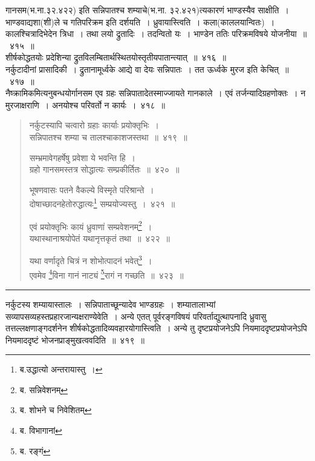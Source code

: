 \documentclass[11pt, openany]{book}
\begin{document}
गानसम(भ.ना.३२.४२२) इति सन्निपातश्च शम्याचे(भ.ना. ३२.४२१)त्यकारणं भाण्डस्यैव साक्षीति~। भाण्डवाद्यशा(शी)ले च गतिपरिक्रम इति दर्शयति~। {\qtt ध्रुवायास्त्विति~।} कला(काललयान्वितः)~। {\qtt कालश्चित्रादिभेदेन} त्रिधा~। तथा लयो द्रुतादिः~। तदन्वितो यः~। भाण्डेन ततिः परिक्रमविषये योजनीया~॥~४१५~॥\\

{\qtt शीर्षकोद्धतयोः प्रदेशिन्या द्रुतविलम्बितार्थस्थितयोस्तृतीयपातान्त्यात्}~॥~४१६~॥\\

{\qtt नर्कुटादीनां प्रासादिकी}~। द्रुतानामूर्ध्वके आद्ये वा देयः सन्निपातः~। तत ऊर्ध्वके मुरज इति केचित्~॥~४१७~॥\\

{\qtt नैष्क्रामिकमित्यनुबन्धयोर्गानसम} एव ग्रहः सन्निपातादेतस्माज्जायते गानकाले~। एवं तर्जन्यादिग्रहणोक्तः~। न मुरजाक्षराणि~। अनयोश्च परिवर्तो न कार्यः~।~४१८~॥

\newpage

\begin{quote}
{\na नर्कुटस्यापि चत्वारो ग्रहाः कार्याः प्रयोक्तृभिः~।\\
 सन्निपातश्च शम्या च तालश्चाकाशजस्तथा~॥~४१९~॥

 सम्भ्रमावेगहर्षेषु प्रवेशा ये भवन्ति हि~।\\
 ग्रहो गानसमस्तत्र सोद्धात्यः सम्प्रकीर्तितः~॥~४२०~॥

 भूषणवासः पतने वैकल्ये विस्मृते परिश्रान्ते~।\\
 दोषाच्छादनहेतोरुद्धात्यः\renewcommand{\thefootnote}{1}\footnote{ब.उद्धात्यो अन्तरायास्तु~।} सम्प्रयोज्यस्तु~।~४२१~॥

 एवं प्रयोक्तृभिः कायं ध्रुवाणां सम्प्रवेशनम्\renewcommand{\thefootnote}{2}\footnote{ब. सन्निवेशनम्}~।\\
 यथास्थानाश्रयोपेतं यथानृत्तकृतं तथा~॥~४२२~॥

 यथा वर्णादृते चित्रं न शोभोत्पादनं भवेत्\renewcommand{\thefootnote}{3}\footnote{ब. शोभने च निवेशितम्}~।\\
 एवमेव \renewcommand{\thefootnote}{4}\footnote{ब. विभागानां}विना गानं नाट्यं \renewcommand{\thefootnote}{5}\footnote{ब. रङ्गं}रागं न गच्छति~॥~४२३~॥}
\end{quote}

\hrule

\vspace{2mm}
{\qtt नर्कुटस्य शम्याया}स्तालः~। सन्निपाताच्छून्यादेव भाण्डग्रहः~। शम्यातालाभ्यां सव्यापसव्यहस्तप्रहारजान्यक्षराण्येवेति~। अन्ये एतत् पूर्वरङ्गविषयं परिवर्ताद्युत्थापनादि ध्रुवासु तत्तल्लक्षणाङ्गदर्शनेन शीर्षकोद्धतादिव्यवहारयोगास्त्विति~। अन्ये तु दृष्टप्रयोजनेऽपि नियमाददृष्टप्रयोजनेऽपि नियमाददृष्टं भोजनप्राङ्मुखत्ववदिति~॥~४१९~॥\\
\end{document}
